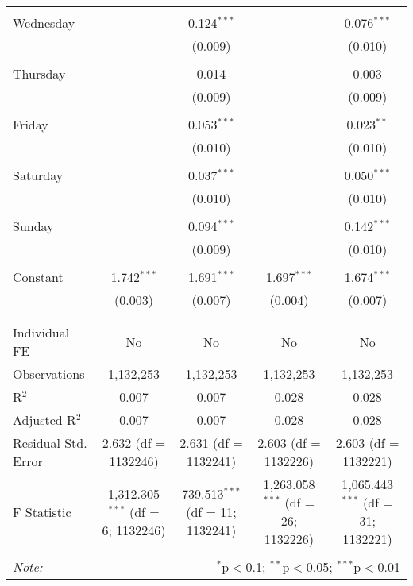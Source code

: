 \documentclass[
]{article}
\begin{document}
\begin{table}[!htbp]
{\begin{tabular}{@{\extracolsep{5pt}}lcccc}
  & & & & \\ 
 Wednesday &  & 0.124$^{***}$ &  & 0.076$^{***}$ \\ 
  &  & (0.009) &  & (0.010) \\ 
  & & & & \\ 
 Thursday &  & 0.014 &  & 0.003 \\ 
  &  & (0.009) &  & (0.009) \\ 
  & & & & \\ 
 Friday &  & 0.053$^{***}$ &  & 0.023$^{**}$ \\ 
  &  & (0.010) &  & (0.010) \\ 
  & & & & \\ 
 Saturday &  & 0.037$^{***}$ &  & 0.050$^{***}$ \\ 
  &  & (0.010) &  & (0.010) \\ 
  & & & & \\ 
 Sunday &  & 0.094$^{***}$ &  & 0.142$^{***}$ \\ 
  &  & (0.009) &  & (0.010) \\ 
  & & & & \\ 
 Constant & 1.742$^{***}$ & 1.691$^{***}$ & 1.697$^{***}$ & 1.674$^{***}$ \\ 
  & (0.003) & (0.007) & (0.004) & (0.007) \\ 
  & & & & \\ 
\hline \\[-1.8ex] 
Individual FE & No & No & No & No \\ 
Observations & 1,132,253 & 1,132,253 & 1,132,253 & 1,132,253 \\ 
R$^{2}$ & 0.007 & 0.007 & 0.028 & 0.028 \\ 
Adjusted R$^{2}$ & 0.007 & 0.007 & 0.028 & 0.028 \\ 
Residual Std. Error & 2.632 (df = 1132246) & 2.631 (df = 1132241) & 2.603 (df = 1132226) & 2.603 (df = 1132221) \\ 
F Statistic & 1,312.305$^{***}$ (df = 6; 1132246) & 739.513$^{***}$ (df = 11; 1132241) & 1,263.058$^{***}$ (df = 26; 1132226) & 1,065.443$^{***}$ (df = 31; 1132221) \\ 
\hline 
\hline \\[-1.8ex] 
\textit{Note:}  & \multicolumn{4}{r}{$^{*}$p$<$0.1; $^{**}$p$<$0.05; $^{***}$p$<$0.01} \\ 
\end{tabular}
} 
\end{table} 
\newpage
\end{document}
